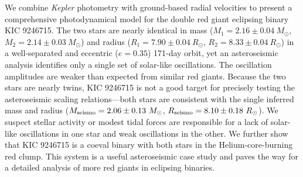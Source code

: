 We combine \emph{Kepler} photometry with ground-based radial velocities to present a comprehensive photodynamical model for the double red giant eclipsing binary KIC 9246715. The two stars are nearly identical in mass ($M_1 = 2.16 \pm 0.04\ M_{\odot}$, $M_2 = 2.14 \pm 0.03\ M_{\odot}$) and radius ($R_1 = 7.90 \pm 0.04 \ R_{\odot}$, $R_2 = 8.33 \pm 0.04 \ R_{\odot}$) in a well-separated and eccentric ($e = 0.35$) 171-day orbit, yet an asteroseismic analysis identifies only a single set of solar-like oscillations. The oscillation amplitudes are weaker than expected from similar red giants. Because the two stars are nearly twins, KIC 9246715 is not a good target for precisely testing the asteroseismic scaling relations---both stars are consistent with the single inferred mass and radius ($M_{\rm{seismo}} = 2.06 \pm 0.13 \ M_{\odot}$, $R_{\rm{seismo}} = 8.10 \pm 0.18 \ R_{\odot}$). We suspect stellar activity or modest tidal forces are responsible for a lack of solar-like oscillations in one star and weak oscillations in the other. We further show that KIC 9246715 is a coeval binary with both stars in the Helium-core-burning red clump. This system is a useful asteroseismic case study and paves the way for a detailed analysis of more red giants in eclipsing binaries.
